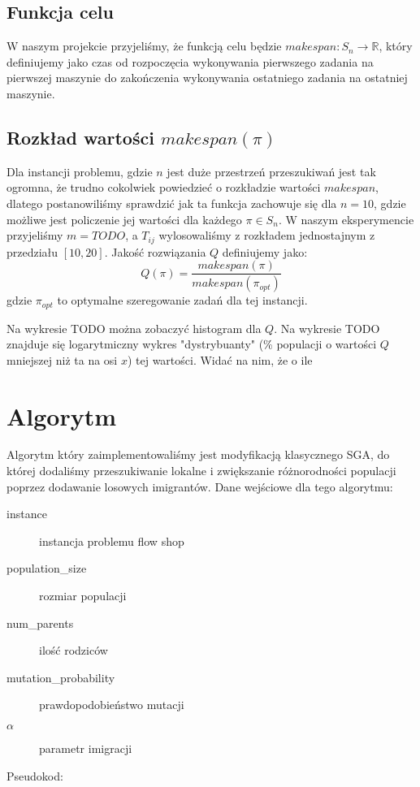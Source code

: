 \documentclass[11pt, a4wide]{article}
\begin{document}
\subsection{Funkcja celu}
W naszym projekcie przyjeliśmy, że funkcją celu będzie  $ makespan : S_n \rightarrow \mathbb{R} $, który
definiujemy jako czas od rozpoczęcia wykonywania pierwszego zadania na pierwszej maszynie do 
zakończenia wykonywania ostatniego zadania na ostatniej maszynie.

\subsection{Rozkład wartości $makespan(\pi)$}
Dla instancji problemu, gdzie $n$ jest duże przestrzeń przeszukiwań jest tak ogromna, że trudno
cokolwiek powiedzieć o rozkładzie wartości $makespan$, dlatego postanowiliśmy sprawdzić jak ta funkcja
zachowuje się dla $n = 10$, gdzie możliwe jest policzenie jej wartości dla każdego $\pi \in S_n$.
W naszym eksperymencie przyjeliśmy $m = TODO$, a $T_{ij}$ wylosowaliśmy z rozkładem jednostajnym 
z przedziału $[10, 20]$. Jakość rozwiązania $Q$ definiujemy jako:
$$ Q(\pi) = \frac{makespan(\pi)}{makespan(\pi_{opt})}$$
gdzie $\pi_{opt}$ to optymalne szeregowanie zadań dla tej instancji.

Na wykresie TODO można zobaczyć histogram dla $Q$. Na wykresie TODO znajduje się logarytmiczny wykres 
"dystrybuanty" (\% populacji o wartości $Q$ mniejszej niż ta na osi $x$) tej wartości. Widać na nim, że 
o ile 




\section{Algorytm}
Algorytm który zaimplementowaliśmy jest modyfikacją klasycznego SGA, do której dodaliśmy przeszukiwanie lokalne
i zwiększanie różnorodności populacji poprzez dodawanie losowych imigrantów. Dane wejściowe dla tego algorytmu:
\begin{description}
  \item[instance] instancja problemu flow shop
  \item[population\_size] rozmiar populacji
  \item[num\_parents] ilość rodziców
  \item[mutation\_probability] prawdopodobieństwo mutacji
  \item[$\alpha$] parametr imigracji
\end{description}
Pseudokod:
\end{document}
